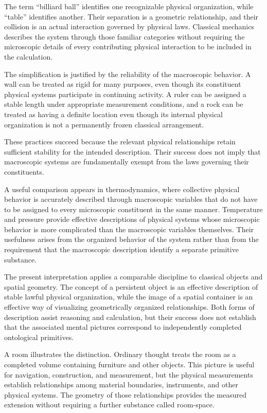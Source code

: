\documentclass[12pt,onecolumn]{article}
\begin{document}
The term ``billiard ball'' identifies one recognizable physical organization, while ``table'' identifies another. Their separation is a geometric relationship, and their collision is an actual interaction governed by physical laws. Classical mechanics describes the system through those familiar categories without requiring the microscopic details of every contributing physical interaction to be included in the calculation.

The simplification is justified by the reliability of the macroscopic behavior. A wall can be treated as rigid for many purposes, even though its constituent physical systems participate in continuing activity. A ruler can be assigned a stable length under appropriate measurement conditions, and a rock can be treated as having a definite location even though its internal physical organization is not a permanently frozen classical arrangement.

These practices succeed because the relevant physical relationships retain sufficient stability for the intended description. Their success does not imply that macroscopic systems are fundamentally exempt from the laws governing their constituents.

A useful comparison appears in thermodynamics, where collective physical behavior is accurately described through macroscopic variables that do not have to be assigned to every microscopic constituent in the same manner. Temperature and pressure provide effective descriptions of physical systems whose microscopic behavior is more complicated than the macroscopic variables themselves. Their usefulness arises from the organized behavior of the system rather than from the requirement that the macroscopic description identify a separate primitive substance.

The present interpretation applies a comparable discipline to classical objects and spatial geometry. The concept of a persistent object is an effective description of stable lawful physical organization, while the image of a spatial container is an effective way of visualizing geometrically organized relationships. Both forms of description assist reasoning and calculation, but their success does not establish that the associated mental pictures correspond to independently completed ontological primitives.

A room illustrates the distinction. Ordinary thought treats the room as a completed volume containing furniture and other objects. This picture is useful for navigation, construction, and measurement, but the physical measurements establish relationships among material boundaries, instruments, and other physical systems. The geometry of those relationships provides the measured extension without requiring a further substance called room-space.
\end{document}
